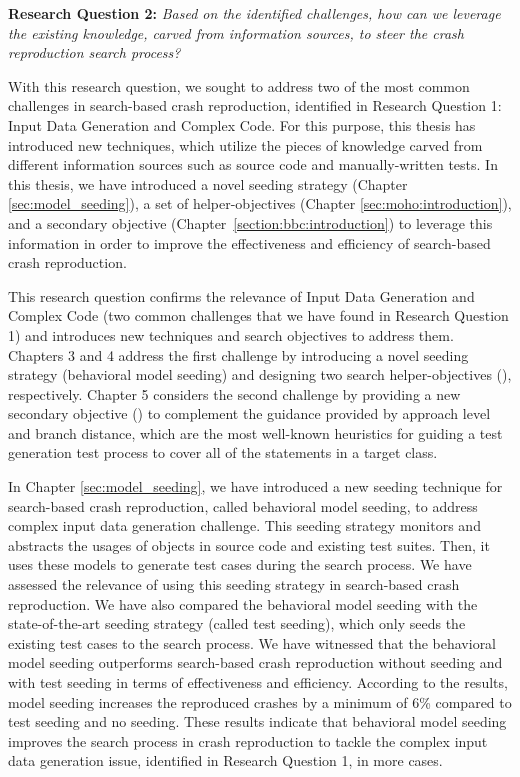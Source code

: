 \textbf{Research Question 2: }\textit{Based on the identified challenges, how can we leverage the existing knowl\-edge, carved from information sources, to steer the crash reproduction search process?}


With this research question, we sought to address two of the most common challenges in search-based crash reproduction, identified in Research Question 1: Input Data Generation and Complex Code. For this purpose, this thesis has introduced new techniques, which utilize the pieces of knowledge carved from different information sources such as source code and manually-written tests. In this thesis, we have introduced a novel seeding strategy (Chapter \ref{sec:model_seeding}), a set of helper-objectives (Chapter \ref{sec:moho:introduction}), and a secondary objective (Chapter~\ref{section:bbc:introduction}) to leverage this information in order to improve the effectiveness and efficiency of search-based crash reproduction.

This research question confirms the relevance of Input Data Generation and Complex Code (two common challenges that we have found in Research Question 1) and introduces new techniques and search objectives to address them. Chapters 3 and 4 address the first challenge by introducing a novel seeding strategy (behavioral model seeding) and designing two search helper-objectives (\moho), respectively. 
Chapter 5 considers the second challenge by providing a new secondary objective (\bbc) to complement the guidance provided by approach level and branch distance, which are the most well-known heuristics for guiding a test generation test process to cover all of the statements in a target class.

In Chapter \ref{sec:model_seeding}, we have introduced a new seeding technique for search-based crash reproduction, called behavioral model seeding, to address complex input data generation challenge. This seeding strategy monitors and abstracts the usages of objects in source code and existing test suites. Then, it uses these models to generate test cases during the search process.
We have assessed the relevance of using this seeding strategy in search-based crash reproduction. We have also compared the behavioral model seeding with the state-of-the-art seeding strategy (called test seeding), which only seeds the existing test cases to the search process. We have witnessed that the behavioral model seeding outperforms search-based crash reproduction without seeding and with test seeding in terms of effectiveness and efficiency. According to the results, model seeding increases the reproduced crashes by a minimum of 6\% compared to test seeding and no seeding. These results indicate that behavioral model seeding improves the search process in crash reproduction to tackle the complex input data generation issue, identified in Research Question 1, in more cases.

